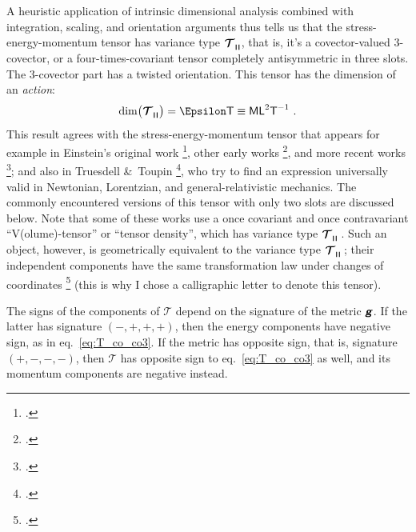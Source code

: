 \documentclass[\ifafour a4paper,12pt,\else a5paper,10pt,\fi%
onecolumn,oneside,article,%
british%
]{memoir}
\makeatletter
\theoremstyle{remark}
\theoremstyle{innote}
\newcommand*{\mathte}[1]{\textbf{\textit{\textsf{#1}}}}
\newcommand*{\citep}{\footcites}
\newcommand*{\amp}{\&}
\renewcommand*{\|}[1][]{\nonscript\,#1\vert\nonscript\;\mathopen{}}
\newcommand*{\sect}{\S}%
\newcommand*{\chap}{ch.}%
\newcommand*{\eqn}{eq.}%
\newcommand*{\eg}{{e.g.}}
\newcommand*{\q}{}%
\DeclareRobustCommand*{\q}{%
  \mathord{\mathpalette\bigcdot@{}}%
}
\newcommand*{\bigcdot@scalefactor}{0.7}
\newcommand*{\bigcdot@widthfactor}{1.5}
\newcommand*{\bigcdot@}[2]{%
  \sbox0{$#1\vcenter{}$}%
  \sbox2{$#1\cdot\m@th$}%
  \hbox to \bigcdot@widthfactor\wd2{%
    \hfil
    \raise\ht0\hbox{%
      \scalebox{\bigcdot@scalefactor}{%
        \lower\ht0\hbox{$#1\bullet\m@th$}%
      }%
    }%
    \hfil
  }%
}
\newcommand*{\Le}{\textsf{L}}
\newcommand*{\Ti}{\textsf{T}}
\newcommand*{\Ma}{\textsf{M}}
\newcommand*{\En}{\Epsilon}%
\newcommand*{\yg}{\mathte{g}}
\newcommand*{\yT}{\bm{\mathcal{T}}}
\renewcommand*{\i}{\indices}
\newcommand*{\rul}{{\mkern2mu\rule[-0.1ex]{0.75pt}{1.1ex}\mkern2mu}}
\DeclarePairedDelimiter\mul{\rul}{\rul}%
\makeatother
\begin{document}
A heuristic application of intrinsic dimensional analysis combined with
integration, scaling, and orientation arguments thus tells us that the
stress-energy-momentum tensor has variance type $\yT\i{_{\q\mul{\q\q\q}}}$,
that is, it's a covector-valued 3-covector, or a four-times-covariant
tensor completely antisymmetric in three slots. The 3-covector part has a
twisted orientation. This tensor has the dimension of an \emph{action}:
\begin{equation}
    \label{eq:final_dim_T}
  \dim\bigl(\yT\i{_{\q \mul{\q\q\q}}}\bigr) = \En\Ti \equiv \Ma\Le^{2}\Ti^{-1} \ .
\end{equation}
This result agrees with the stress-energy-momentum tensor that appears for
example in Einstein's original work \citep[\sect~C.9, discussion before
\eqn~(42a)]{einstein1914b}, other early works
\citep[\eg][\sect~IV.54]{pauli1921_t1958}[\sect~13]{cartan1923}[\sect~7]{brillouin1924},
and more recent works \citep[\sect~VIII.3]{fokker1960_t1965}[\chap~14
Exercise~14.18, \chap~15,
\sect~21.3]{misneretal1970_r1973}{hehletal1986,gotayetal1992,gronwaldetal1997,castrillonlopezetal2008,castrillonlopezetal2009}[see
also][for similar conclusions in general manifolds and in Newtonian
mechanics]{segevetal1999,kansoetal2007}; and also in Truesdell \amp\ Toupin
\citep[\sect~F.IV.288]{truesdelletal1960}, who try to find an expression
universally valid in Newtonian, Lorentzian, and general-relativistic
mechanics. The commonly encountered versions of this tensor with only two
slots are discussed below.
Note that some of these works use a once covariant and once contravariant
\enquote{V(olume)-tensor} or \enquote{tensor density}, which has variance
type $\yT\i{_{\q}^{\q}_{\mul{\q\q\q\q}}}\,$. Such an object, however, is
geometrically equivalent to the variance type $\yT\i{_{\q \mul{\q\q\q}}}\,$;
their independent components have the same transformation law under changes
of coordinates \citep[\sect~II.8 p.~30]{schouten1951_r1989} (this is why I
chose a calligraphic letter to denote this tensor). %

The signs of the components of $\yT$ depend on the signature of the metric
$\yg$. If the latter has signature $(-,+,+,+)$, then the energy components
have negative sign, as in \eqn~\eqref{eq:T_co_co3}. If the metric has
opposite sign, that is, signature $(+,-,-,-)$, then $\yT$ has opposite sign
to \eqn~\eqref{eq:T_co_co3} as well, and its momentum components are
negative instead.
\end{document}
